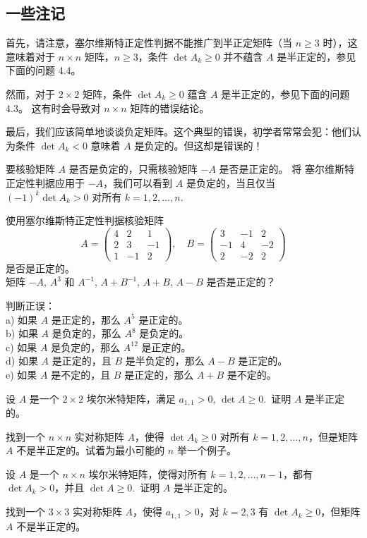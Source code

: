 \subsection{一些注记}\label{sec:07-04-03}
首先，请注意，塞尔维斯特正定性判据不能推广到半正定矩阵（当 $n \ge 3$ 时），这意味着对于 $n \times n$ 矩阵，$n \ge 3$，条件 $\det A_k \ge 0$ 并不蕴含 $A$ 是半正定的，参见下面的问题 4.4。

然而，对于 $2 \times 2$ 矩阵，条件 $\det A_k \ge 0$ 蕴含 $A$ 是半正定的，参见下面的问题 4.3。
这有时会导致对 $n \times n$ 矩阵的错误结论。

最后，我们应该简单地谈谈负定矩阵。这个典型的错误，初学者常常会犯：他们认为条件 $\det A_k < 0$ 意味着 $A$ 是负定的。但这却是错误的！

要核验矩阵 $A$ 是否是负定的，只需核验矩阵 $-A$ 是否是正定的。
将 塞尔维斯特正定性判据应用于 $-A$，我们可以看到 $A$ 是负定的，当且仅当 $(-1)^k \det A_k > 0$ 对所有 $k = 1, 2, \dots, n$.~

\begin{problemset}
\item \label{ex:07-04-01} 使用塞尔维斯特正定性判据核验矩阵
$$A = \begin{pmatrix} 4 & 2 & 1 \\ 2 & 3 & -1 \\ 1 & -1 & 2 \end{pmatrix},\quad B = \begin{pmatrix} 3 & -1 & 2 \\ -1 & 4 & -2 \\ 2 & -2 & 2 \end{pmatrix}$$
是否是正定的。
\\
矩阵 $-A$, $A^3$ 和 $A^{-1}$, $A+B^{-1}$, $A+B$, $A-B$ 是否是正定的？
\item \label{ex:07-04-02} 判断正误：
\\
a) 如果 $A$ 是正定的，那么 $A^5$ 是正定的。
\\
b) 如果 $A$ 是负定的，那么 $A^8$ 是负定的。
\\
c) 如果 $A$ 是负定的，那么 $A^{12}$ 是正定的。
\\
d) 如果 $A$ 是正定的，且 $B$ 是半负定的，那么 $A-B$ 是正定的。
\\
e) 如果 $A$ 是不定的，且 $B$ 是正定的，那么 $A+B$ 是不定的。
\item \label{ex:07-04-03} 设 $A$ 是一个 $2 \times 2$ 埃尔米特矩阵，满足 $a_{1,1} > 0$, $\det A \ge 0$.~证明 $A$ 是半正定的。
\item \label{ex:07-04-04} 找到一个 $n \times n$ 实对称矩阵 $A$，使得 $\det A_k \ge 0$ 对所有 $k = 1, 2, \dots, n$，但是矩阵 $A$ 不是半正定的。试着为最小可能的 $n$ 举一个例子。
\item \label{ex:07-04-05} 设 $A$ 是一个 $n \times n$ 埃尔米特矩阵，使得对所有 $k = 1, 2, \dots, n-1$，都有 $\det A_k > 0$，并且 $\det A \ge 0$.~证明 $A$ 是半正定的。
\item \label{ex:07-04-06} 找到一个 $3 \times 3$ 实对称矩阵 $A$，使得 $a_{1,1} > 0$，对 $k=2,3$ 有 $\det A_k \ge 0$，但矩阵 $A$ 不是半正定的。

\end{problemset}


